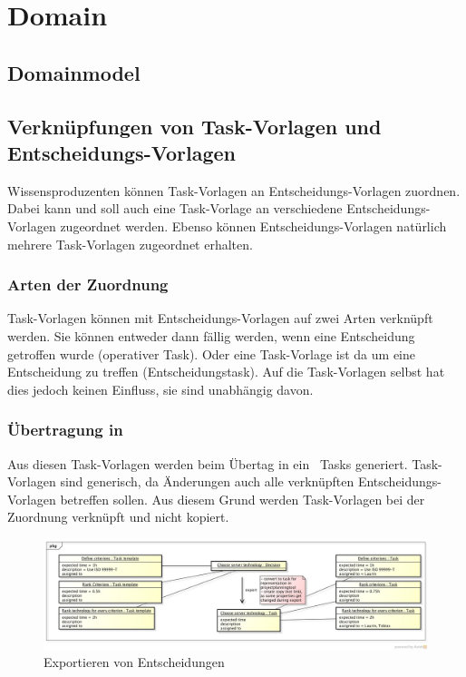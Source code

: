 	\section{Domain} 
		\subsection{Domainmodel}
	
		\subsection{Verknüpfungen von Task-Vorlagen und Entscheidungs-Vorlagen}
			Wissensproduzenten können Task-Vorlagen an Entscheidungs-Vorlagen zuordnen.
			Dabei kann und soll auch eine Task-Vorlage an verschiedene Entscheidungs-Vorlagen zugeordnet werden.
			Ebenso können Entscheidungs-Vorlagen natürlich mehrere Task-Vorlagen zugeordnet erhalten.
			
			\subsubsection{Arten der Zuordnung}
				Task-Vorlagen können mit Entscheidungs-Vorlagen auf zwei Arten verknüpft werden.
				Sie können entweder dann fällig werden, wenn eine Entscheidung getroffen wurde (operativer Task).
				Oder eine Task-Vorlage ist da um eine Entscheidung zu treffen (Entscheidungstask).
				Auf die Task-Vorlagen selbst hat dies jedoch keinen Einfluss, sie sind unabhängig davon.

			\subsubsection{Übertragung in \ppt}
				Aus diesen Task-Vorlagen werden beim Übertag in ein \ppt\ Tasks generiert.
				Task-Vorlagen sind generisch, da Änderungen auch alle verknüpften Entscheidungs-Vorlagen betreffen sollen.
				Aus diesem Grund werden Task-Vorlagen bei der Zuordnung verknüpft und nicht kopiert.
				
				\begin{figure}[H]
					\includegraphics[width=\textwidth]{architecture/media/img/DecisionTaskRelation.jpg}
					\centering
					\caption{Exportieren von Entscheidungen}
					\label{fig:DecisionTaskRelation}
				\end{figure}
				
